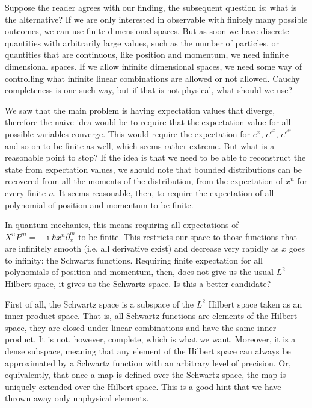 \documentclass[10pt,twocolumn, nofootinbib]{revtex4-2}
\begin{document}
Suppose the reader agrees with our finding, the subsequent question is: what is the alternative? If we are only interested in observable with finitely many possible outcomes, we can use finite dimensional spaces. But as soon we have discrete quantities with arbitrarily large values, such as the number of particles, or quantities that are continuous, like position and momentum, we need infinite dimensional spaces. If we allow infinite dimensional spaces, we need some way of controlling what infinite linear combinations are allowed or not allowed. Cauchy completeness is one such way, but if that is not physical, what should we use?

We saw that the main problem is having expectation values that diverge, therefore the naive idea would be to require that the expectation value for all possible variables converge. This would require the expectation for $e^x$, $e^{e^x}$, $e^{e^{e^x}}$ and so on to be finite as well, which seems rather extreme. But what is a reasonable point to stop? If the idea is that we need to be able to reconstruct the state from expectation values, we should note that bounded distributions can be recovered from all the moments of the distribution, from the expectation of $x^n$ for every finite $n$. It seems reasonable, then, to require the expectation of all polynomial of position and momentum to be finite.

In quantum mechanics, this means requiring all expectations of $X^nP^m = -\imath \hbar x^n\partial_x ^m$ to be finite. This restricts our space to those functions that are infinitely smooth (i.e. all derivative exist) and decrease very rapidly as $x$ goes to infinity: the Schwartz functions. Requiring finite expectation for all polynomials of position and momentum, then, does not give us the usual $L^2$ Hilbert space, it gives us the Schwartz space. Is this a better candidate?

First of all, the Schwartz space is a subspace of the $L^2$ Hilbert space taken as an inner product space. That is, all Schwartz functions are elements of the Hilbert space, they are closed under linear combinations and have the same inner product. It is not, however, complete, which is what we want. Moreover, it is a dense subspace, meaning that any element of the Hilbert space can always be approximated by a Schwartz function with an arbitrary level of precision. Or, equivalently, that once a map is defined over the Schwartz space, the map is uniquely extended over the Hilbert space. This is a good hint that we have thrown away only unphysical elements.
\end{document}
